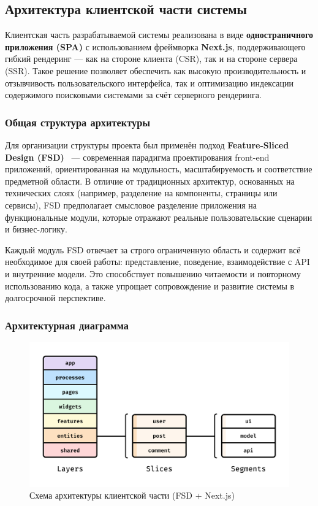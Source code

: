 \subsection{Архитектура клиентской части системы}

Клиентская часть разрабатываемой системы реализована в виде \textbf{одностраничного приложения (SPA)} с использованием фреймворка \textbf{Next.js}, поддерживающего гибкий рендеринг — как на стороне клиента (CSR), так и на стороне сервера (SSR). Такое решение позволяет обеспечить как высокую производительность и отзывчивость пользовательского интерфейса, так и оптимизацию индексации содержимого поисковыми системами за счёт серверного рендеринга.

\subsubsection{Общая структура архитектуры}

Для организации структуры проекта был применён подход \textbf{Feature-Sliced Design (FSD)}~\cite{feature_sliced_design} — современная парадигма проектирования front-end приложений, ориентированная на модульность, масштабируемость и соответствие предметной области. В отличие от традиционных архитектур, основанных на технических слоях (например, разделение на компоненты, страницы или сервисы), FSD предполагает смысловое разделение приложения на функциональные модули, которые отражают реальные пользовательские сценарии и бизнес-логику.

Каждый модуль FSD отвечает за строго ограниченную область и содержит всё необходимое для своей работы: представление, поведение, взаимодействие с API и внутренние модели. Это способствует повышению читаемости и повторному использованию кода, а также упрощает сопровождение и развитие системы в долгосрочной перспективе.

\subsubsection{Архитектурная диаграмма}

\begin{figure}[H]
  \centering
  \includegraphics[width=0.7\linewidth]{static/fsdImage}
  \caption{Схема архитектуры клиентской части (FSD + Next.js)}
\end{figure}


